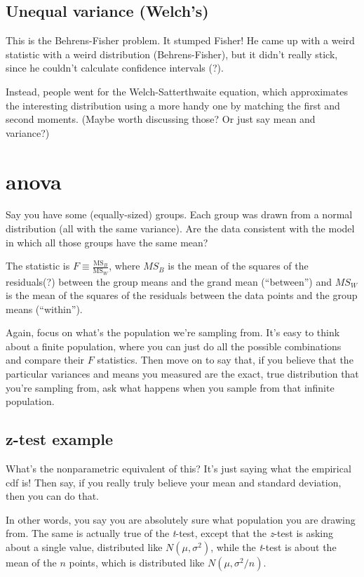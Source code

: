 \subsection{Unequal variance (Welch's)}\label{unequal-variance-welchs}

This is the Behrens-Fisher problem. It stumped Fisher! He came up with a
weird statistic with a weird distribution (Behrens-Fisher), but it
didn't really stick, since he couldn't calculate confidence intervals
(?).

Instead, people went for the Welch-Satterthwaite equation, which
approximates the interesting distribution using a more handy one by
matching the first and second moments. (Maybe worth discussing those? Or
just say mean and variance?)

\section{anova}\label{anova}

Say you have some (equally-sized) groups. Each group was drawn from a
normal distribution (all with the same variance). Are the data
consistent with the model in which all those groups have the same mean?

The statistic is \(F \equiv \frac{\mathrm{MS}_B}{\mathrm{MS}_W}\), where
\(MS_B\) is the mean of the squares of the residuals(?) between the
group means and the grand mean (``between'') and \(MS_W\) is the mean of
the squares of the residuals between the data points and the group means
(``within'').

Again, focus on what's the population we're sampling from. It's easy to
think about a finite population, where you can just do all the possible
combinations and compare their \(F\) statistics. Then move on to say
that, if you believe that the particular variances and means you
measured are the exact, true distribution that you're sampling from, ask
what happens when you sample from that infinite population.

\subsection{z-test example}\label{z-test-example}

What's the nonparametric equivalent of this? It's just saying what the
empirical cdf is! Then say, if you really truly believe your mean and
standard deviation, then you can do that.

In other words, you say you are absolutely sure what population you are
drawing from. The same is actually true of the \emph{t}-test, except
that the \emph{z}-test is asking about a single value, distributed like
\(N(\mu, \sigma^2)\), while the \emph{t}-test is about the mean of the
\(n\) points, which is distributed like \(N(\mu, \sigma^2/n)\).

